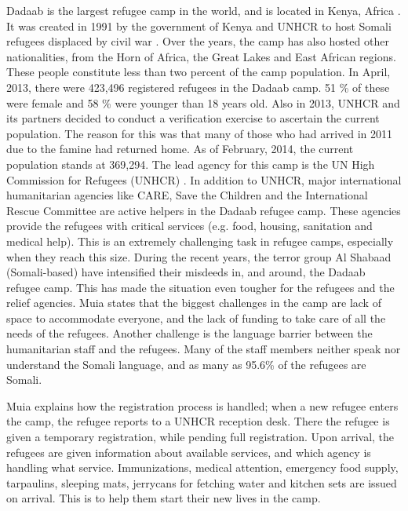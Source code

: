 Dadaab is the largest refugee camp in the world, and is located in Kenya, Africa \cite{dadaab}. It was created in 1991 by the government of Kenya and UNHCR to host Somali refugees displaced by civil war \cite{dadaabcare}. Over the years, the camp has also hosted other nationalities, from the Horn of Africa, the Great Lakes and East African regions. These people constitute less than two percent of the camp population. In April, 2013, there were 423,496 registered refugees in the Dadaab camp. 51 \% of these were female and 58 \% were younger than 18 years old. Also in 2013, UNHCR and its partners decided to conduct a verification exercise to ascertain the current population. The reason for this was that many of those who had arrived in 2011 due to the famine had returned home. As of February, 2014, the current population stands at 369,294. The lead agency for this camp is the UN High Commission for Refugees (UNHCR) \cite{dadaab}. In addition to UNHCR, major international humanitarian agencies like CARE, Save the Children and the International Rescue Committee are active helpers in the Dadaab refugee camp. These agencies provide the refugees with critical services (e.g. food, housing, sanitation and medical help). This is an extremely challenging task in refugee camps, especially when they reach this size. During the recent years, the terror group Al Shabaad (Somali-based) have intensified their misdeeds in, and around, the Dadaab refugee camp. This has made the situation even tougher for the refugees and the relief agencies. 
Muia states that the biggest challenges in the camp are lack of space to accommodate everyone, and the lack of funding to take care of all the needs of the refugees. Another challenge is the language barrier between the humanitarian staff and the refugees. Many of the staff members neither speak nor understand the Somali language, and as many as 95.6\% of the refugees are Somali. 

Muia explains how the registration process is handled; when a new refugee enters the camp, the refugee reports to a UNHCR reception desk. There the refugee is given a temporary registration, while pending full registration. Upon arrival, the refugees are given information about available services, and which agency is handling what service. Immunizations, medical attention, emergency food supply, tarpaulins, sleeping mats, jerrycans for fetching water and kitchen sets are issued on arrival. This is to help them start their new lives in the camp. 

